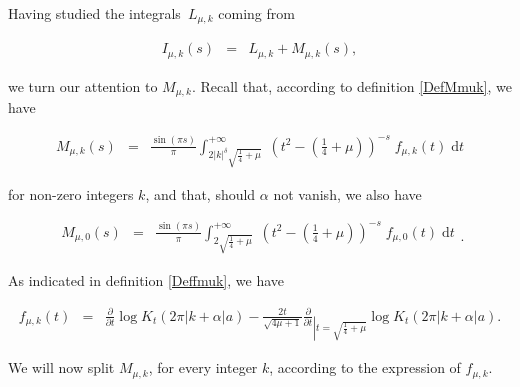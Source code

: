 \documentclass{jams-l}
\theoremstyle{definition}
\theoremstyle{remark}
\numberwithin{equation}{section}
\begin{document}
        Having studied the integrals~$L_{\mu,k}$ coming from 
        
        \[ \begin{array}{lll}
                I_{\mu,k} \left( s \right) & = & L_{\mu,k} + M_{\mu,k} \left( s \right),
            \end{array} \]
        
        \noindent we turn our attention to $M_{\mu,k}$. Recall that, according to definition \ref{DefMmuk}, we have
        
        \[ \begin{array}{lll}
                M_{\mu,k} \left( s \right) & = & \displaystyle \frac{\sin \left( \pi s \right)}{\pi} \int_{2 \left \vert k \right \vert^{\delta} \sqrt{\frac{1}{4} + \mu}}^{+ \infty} \; \left( t^2 - \left( \frac{1}{4} + \mu \right) \right)^{-s} \; f_{\mu,k} \left( t \right) \; \text{d}t
            \end{array} \]
            
        \noindent for non-zero integers $k$, and that, should $\alpha$ not vanish, we also have
            
        \[ \begin{array}{lll}
                M_{\mu,0} \left( s \right) & = & \displaystyle \frac{\sin \left( \pi s \right)}{\pi} \int_{2 \sqrt{\frac{1}{4} + \mu}}^{+ \infty} \; \left( t^2 - \left( \frac{1}{4} + \mu \right) \right)^{-s} \; f_{\mu,0} \left( t \right) \; \text{d}t
            \end{array} . \]
            
        \noindent As indicated in definition \ref{Deffmuk}, we have
        
        \[ \begin{array}{lll}
                f_{\mu,k} \left( t \right) & = & \frac{\partial}{\partial t} \log K_t \left( 2\pi \left \vert k + \alpha \right \vert a \right) - \frac{2t}{\sqrt{4 \mu + 1}} \frac{\partial}{\partial t}_{\left \vert t = \sqrt{\frac{1}{4} + \mu} \right.} \log K_t \left( 2 \pi \left \vert k + \alpha \right \vert a \right).
            \end{array} \]
        
        \noindent We will now split $M_{\mu,k}$, for every integer $k$, according to the expression of $f_{\mu,k}$.
        
\end{document}
